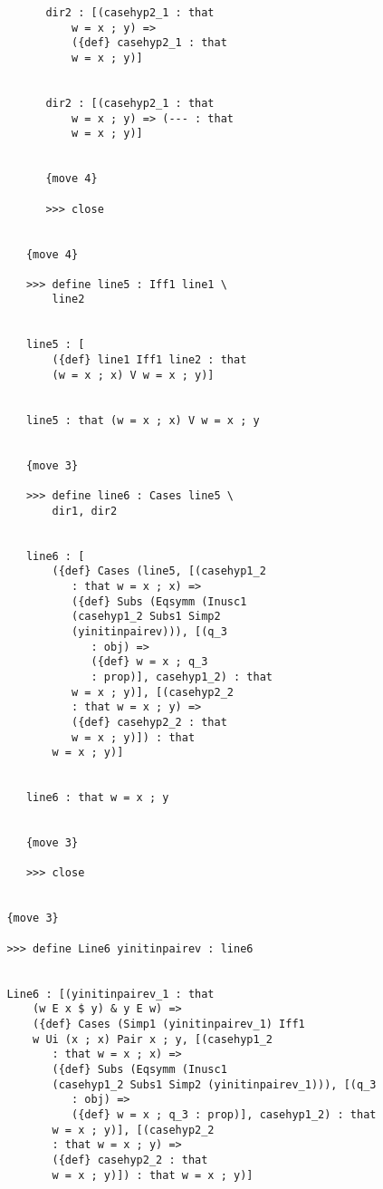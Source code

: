 \documentclass[12pt]{article}
\begin{document}
\begin{verbatim}
               dir2 : [(casehyp2_1 : that 
                   w = x ; y) => 
                   ({def} casehyp2_1 : that 
                   w = x ; y)]


               dir2 : [(casehyp2_1 : that 
                   w = x ; y) => (--- : that 
                   w = x ; y)]


               {move 4}

               >>> close


            {move 4}

            >>> define line5 : Iff1 line1 \
                line2


            line5 : [
                ({def} line1 Iff1 line2 : that 
                (w = x ; x) V w = x ; y)]


            line5 : that (w = x ; x) V w = x ; y


            {move 3}

            >>> define line6 : Cases line5 \
                dir1, dir2


            line6 : [
                ({def} Cases (line5, [(casehyp1_2 
                   : that w = x ; x) => 
                   ({def} Subs (Eqsymm (Inusc1 
                   (casehyp1_2 Subs1 Simp2 
                   (yinitinpairev))), [(q_3 
                      : obj) => 
                      ({def} w = x ; q_3 
                      : prop)], casehyp1_2) : that 
                   w = x ; y)], [(casehyp2_2 
                   : that w = x ; y) => 
                   ({def} casehyp2_2 : that 
                   w = x ; y)]) : that 
                w = x ; y)]


            line6 : that w = x ; y


            {move 3}

            >>> close


         {move 3}

         >>> define Line6 yinitinpairev : line6


         Line6 : [(yinitinpairev_1 : that 
             (w E x $ y) & y E w) => 
             ({def} Cases (Simp1 (yinitinpairev_1) Iff1 
             w Ui (x ; x) Pair x ; y, [(casehyp1_2 
                : that w = x ; x) => 
                ({def} Subs (Eqsymm (Inusc1 
                (casehyp1_2 Subs1 Simp2 (yinitinpairev_1))), [(q_3 
                   : obj) => 
                   ({def} w = x ; q_3 : prop)], casehyp1_2) : that 
                w = x ; y)], [(casehyp2_2 
                : that w = x ; y) => 
                ({def} casehyp2_2 : that 
                w = x ; y)]) : that w = x ; y)]



\end{verbatim}
\end{document}
